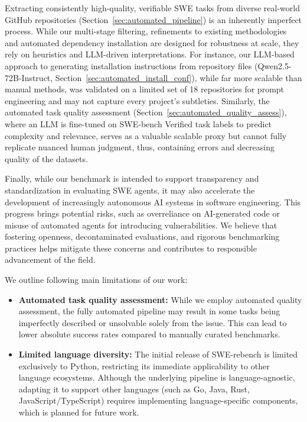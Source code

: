 \documentclass[dandb]{article}
\begin{document}
Extracting consistently high-quality, verifiable SWE tasks from diverse real-world GitHub repositories (Section~\ref{sec:automated_pipeline}) is an inherently imperfect process. While our multi-stage filtering, refinements to existing methodologies and automated dependency installation are designed for robustness at scale, they rely on heuristics and LLM-driven interpretations. For instance, our LLM-based approach to generating installation instructions from repository files (Qwen2.5-72B-Instruct, Section~\ref{sec:automated_install_conf}), while far more scalable than manual methods, was validated on a limited set of 18 repositories for prompt engineering and may not capture every project's subtleties. Similarly, the automated task quality assessment (Section~\ref{sec:automated_quality_assess}), where an LLM is fine-tuned on SWE-bench Verified task labels to predict complexity and relevance, serves as a valuable scalable proxy but cannot fully replicate nuanced human judgment, thus, containing errors and decreasing quality of the datasets.

Finally, while our benchmark is intended to support transparency and standardization in evaluating SWE agents, it may also accelerate the development of increasingly autonomous AI systems in software engineering. This progress brings potential risks, such as overreliance on AI-generated code or misuse of automated agents for introducing vulnerabilities. We believe that fostering openness, decontaminated evaluations, and rigorous benchmarking practices helps mitigate these concerns and contributes to responsible advancement of the field.

We outline following main limitations of our work:

\begin{itemize}
    \item \textbf{Automated task quality assessment:} While we employ automated quality assessment, the fully automated pipeline may result in some tasks being imperfectly described or unsolvable solely from the issue. This can lead to lower absolute success rates compared to manually curated benchmarks.
    \item \textbf{Limited language diversity:} The initial release of SWE-rebench is limited exclusively to Python, restricting its immediate applicability to other language ecosystems. Although the underlying pipeline is language-agnostic, adapting it to support other languages (such as Go, Java, Rust, JavaScript/TypeScript) requires implementing language-specific components, which is planned for future work.
\end{itemize}
\end{document}
